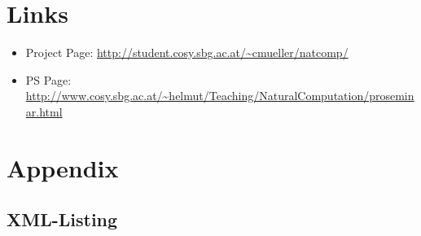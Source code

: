 \documentclass[12pt,fleqn,a4paper]{article}
\begin{document}
\newpage



\section{Links}

\begin{itemize}
 \item Project Page: \url{http://student.cosy.sbg.ac.at/~cmueller/natcomp/}
 \item PS Page: \url{http://www.cosy.sbg.ac.at/~helmut/Teaching/NaturalComputation/proseminar.html}
\end{itemize}




\section{Appendix}

\subsection{XML-Listing}
\end{document}
